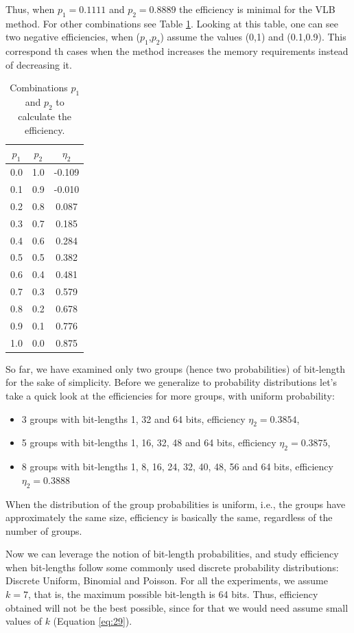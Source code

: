 \documentclass[10pt]{article}
\begin{document}
Thus, when $p_1=0.1111$ and $p_2=0.8889$ the efficiency is minimal for the VLB method. For other combinations see Table \ref{tab:02}. Looking at this table, one can see two negative efficiencies, when ($p_1$,$p_2$) assume the values ​​(0,1) and (0.1,0.9). This correspond th cases when the method increases the memory requirements instead of decreasing it.

\begin{table}[h]
 \centering
 \caption{Combinations $p_1$ and $p_2$ to calculate the efficiency.}
 \begin{tabular}{ccc}
  \hline 
  $p_1$  & $p_2$ & $\eta_2$ \\
  \hline
  0.0	&1.0    &-0.109 \\
  0.1	&0.9	&-0.010 \\
  0.2	&0.8	&0.087 \\
  0.3	&0.7	&0.185 \\
  0.4	&0.6	&0.284 \\
  0.5	&0.5	&0.382 \\
  0.6	&0.4	&0.481 \\
  0.7	&0.3	&0.579 \\ 
  0.8	&0.2	&0.678 \\
  0.9	&0.1	&0.776 \\ 
  1.0	&0.0	&0.875 \\
  \hline
 \end{tabular}
 \label{tab:02}
\end{table}

So far, we have examined only two groups (hence two probabilities) of bit-length for the sake of simplicity. Before we generalize to probability distributions let's take a quick look at the efficiencies for more groups, with uniform probability:

\begin{itemize}
  \item 3 groups with bit-lengths 1, 32 and 64 bits, efficiency $\eta_2=0.3854$,
  \item 5 groups with bit-lengths 1, 16, 32, 48 and 64 bits, efficiency $\eta_2=0.3875$,
  \item 8 groups with bit-lengths 1, 8, 16, 24, 32, 40, 48, 56 and 64 bits, efficiency $\eta_2=0.3888$
\end{itemize}

When the distribution of the group probabilities is uniform, i.e., the groups have approximately the same size, efficiency is basically the same, regardless of the number of groups.

Now we can leverage the notion of bit-length probabilities, and study efficiency when bit-lengths follow some  commonly used discrete probability distributions: Discrete Uniform, Binomial and Poisson. For all the experiments, we assume $k=7$, that is, the maximum possible bit-length is 64 bits. Thus, efficiency obtained will not be the best possible, since for that we would need assume small values of $k$ (Equation \ref{eq:29}). 
\end{document}
